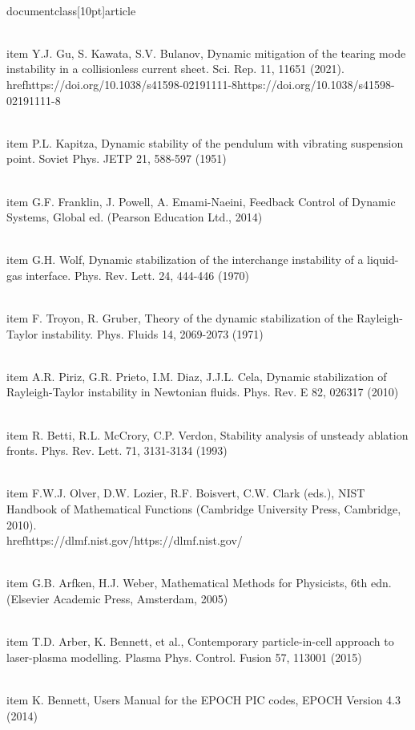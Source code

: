 \\documentclass[10pt]{article}
\begin{document}
{{{{{{  \\item Y.J. Gu, S. Kawata, S.V. Bulanov, Dynamic mitigation of the tearing mode instability in a collisionless current sheet. Sci. Rep. 11, 11651 (2021). \\href{https://doi.org/10.1038/s41598-02191111-8}{https://doi.org/10.1038/s41598-02191111-8}

  \\item P.L. Kapitza, Dynamic stability of the pendulum with vibrating suspension point. Soviet Phys. JETP 21, 588-597 (1951)

  \\item G.F. Franklin, J. Powell, A. Emami-Naeini, Feedback Control of Dynamic Systems, Global ed. (Pearson Education Ltd., 2014)

  \\item G.H. Wolf, Dynamic stabilization of the interchange instability of a liquid-gas interface. Phys. Rev. Lett. 24, 444-446 (1970)

  \\item F. Troyon, R. Gruber, Theory of the dynamic stabilization of the Rayleigh-Taylor instability. Phys. Fluids 14, 2069-2073 (1971)

  \\item A.R. Piriz, G.R. Prieto, I.M. Diaz, J.J.L. Cela, Dynamic stabilization of Rayleigh-Taylor instability in Newtonian fluids. Phys. Rev. E 82, 026317 (2010)

  \\item R. Betti, R.L. McCrory, C.P. Verdon, Stability analysis of unsteady ablation fronts. Phys. Rev. Lett. 71, 3131-3134 (1993)

  \\item F.W.J. Olver, D.W. Lozier, R.F. Boisvert, C.W. Clark (eds.), NIST Handbook of Mathematical Functions (Cambridge University Press, Cambridge, 2010). \\href{https://dlmf.nist.gov/}{https://dlmf.nist.gov/}

  \\item G.B. Arfken, H.J. Weber, Mathematical Methods for Physicists, 6th edn. (Elsevier Academic Press, Amsterdam, 2005)

  \\item T.D. Arber, K. Bennett, et al., Contemporary particle-in-cell approach to laser-plasma modelling. Plasma Phys. Control. Fusion 57, 113001 (2015)

  \\item K. Bennett, Users Manual for the EPOCH PIC codes, EPOCH Version 4.3 (2014)

}}}}}}
\end{document}
